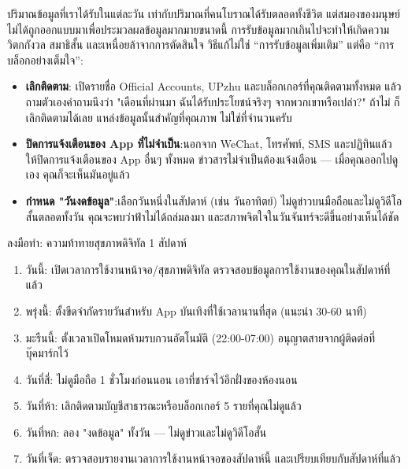 
ปริมาณข้อมูลที่เราได้รับในแต่ละวัน เท่ากับปริมาณที่คนโบราณได้รับตลอดทั้งชีวิต แต่สมองของมนุษย์ไม่ได้ถูกออกแบบมาเพื่อประมวลผลข้อมูลมากมายขนาดนี้ การรับข้อมูลมากเกินไปจะทำให้เกิดความวิตกกังวล สมาธิสั้น และเหนื่อยล้าจากการตัดสินใจ วิธีแก้ไม่ใช่ “การรับข้อมูลเพิ่มเติม” แต่คือ “การบล็อกอย่างเต็มใจ”:

\begin{itemize}
  \item \textbf{เลิกติดตาม}: เปิดรายชื่อ Official Accounts, UPzhu และบล็อกเกอร์ที่คุณติดตามทั้งหมด แล้วถามตัวเองคำถามนึงว่า "เดือนที่ผ่านมา ฉันได้รับประโยชน์จริงๆ จากพวกเขาหรือเปล่า?" ถ้าไม่ ก็เลิกติดตามได้เลย แหล่งข้อมูลนั้นสำคัญที่คุณภาพ ไม่ใช่ที่จำนวนครับ
  \item \textbf{ปิดการแจ้งเตือนของ App ที่ไม่จำเป็น}:นอกจาก WeChat, โทรศัพท์, SMS และปฏิทินแล้ว ให้ปิดการแจ้งเตือนของ App อื่นๆ ทั้งหมด ข่าวสารไม่จำเป็นต้องแจ้งเตือน — เมื่อคุณออกไปดูเอง คุณก็จะเห็นมันอยู่แล้ว
  \item \textbf{กำหนด "วันงดข้อมูล"}:เลือกวันหนึ่งในสัปดาห์ (เช่น วันอาทิตย์) ไม่ดูข่าวบนมือถือและไม่ดูวิดีโอสั้นตลอดทั้งวัน คุณจะพบว่าฟ้าไม่ได้ถล่มลงมา และสภาพจิตใจในวันจันทร์จะดีขึ้นอย่างเห็นได้ชัด
\end{itemize}

\begin{tcbpractice}{ลงมือทำ: ความท้าทายสุขภาพดิจิทัล 1 สัปดาห์}
\begin{enumerate}
  \item วันนี้: เปิดเวลาการใช้งานหน้าจอ/สุขภาพดิจิทัล ตรวจสอบข้อมูลการใช้งานของคุณในสัปดาห์ที่แล้ว
  \item พรุ่งนี้: ตั้งขีดจำกัดรายวันสำหรับ App บันเทิงที่ใช้เวลานานที่สุด (แนะนำ 30-60 นาที)
  \item มะรืนนี้: ตั้งเวลาเปิดโหมดห้ามรบกวนอัตโนมัติ (22:00-07:00) อนุญาตสายจากผู้ติดต่อที่บุ๊คมาร์กไว้
  \item วันที่สี่: ไม่ดูมือถือ 1 ชั่วโมงก่อนนอน เอาที่ชาร์จไว้อีกฝั่งของห้องนอน
  \item วันที่ห้า: เลิกติดตามบัญชีสาธารณะหรือบล็อกเกอร์ 5 รายที่คุณไม่ดูแล้ว
  \item วันที่หก: ลอง "งดข้อมูล" ทั้งวัน — ไม่ดูข่าวและไม่ดูวิดีโอสั้น
  \item วันที่เจ็ด: ตรวจสอบรายงานเวลาการใช้งานหน้าจอของสัปดาห์นี้ และเปรียบเทียบกับสัปดาห์ที่แล้ว
\end{enumerate}

\end{tcbpractice}

